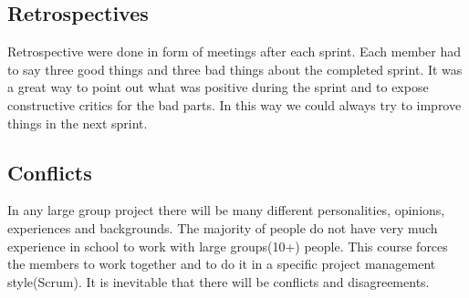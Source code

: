 \subsection{Retrospectives}
Retrospective were done in form of meetings after each sprint. Each member had to say three good things and three bad things about
the completed sprint. It was a great way to point out what was positive during the sprint
and to expose constructive critics for the bad parts. In this way we could always try to improve things in the next sprint.

\subsection{Conflicts}
In any large group project there will be many different personalities, opinions, experiences and backgrounds. The majority of people do not have very much experience in school to work with large groups(10+) people. This course forces the members to work together and to do it in a specific project management style(Scrum). It is inevitable that there will be conflicts and disagreements. 

